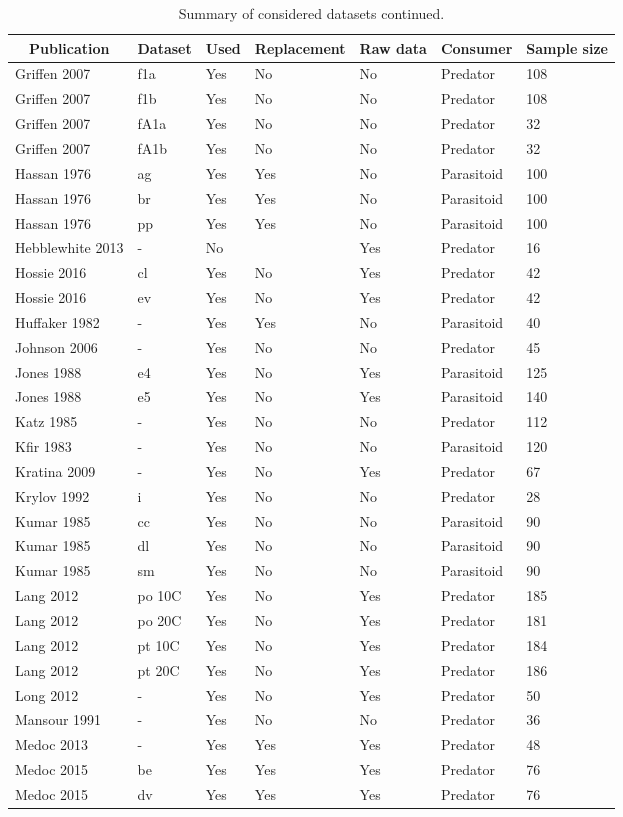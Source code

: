 \begin{table}[!tbp]
\caption{Summary of considered datasets continued.\label{table:datasets}} 
\begin{center}
\begin{tabular}{lllllll}
\hline\hline
\multicolumn{1}{c}{Publication}&\multicolumn{1}{c}{Dataset}&\multicolumn{1}{c}{Used}&\multicolumn{1}{c}{Replacement}&\multicolumn{1}{c}{Raw data}&\multicolumn{1}{c}{Consumer}&\multicolumn{1}{c}{Sample size}\tabularnewline
\hline
Griffen 2007&f1a&Yes&No&No&Predator&108\tabularnewline
Griffen 2007&f1b&Yes&No&No&Predator&108\tabularnewline
Griffen 2007&fA1a&Yes&No&No&Predator&32\tabularnewline
Griffen 2007&fA1b&Yes&No&No&Predator&32\tabularnewline
Hassan 1976&ag&Yes&Yes&No&Parasitoid&100\tabularnewline
Hassan 1976&br&Yes&Yes&No&Parasitoid&100\tabularnewline
Hassan 1976&pp&Yes&Yes&No&Parasitoid&100\tabularnewline
Hebblewhite 2013&-&No&&Yes&Predator&16\tabularnewline
Hossie 2016&cl&Yes&No&Yes&Predator&42\tabularnewline
Hossie 2016&ev&Yes&No&Yes&Predator&42\tabularnewline
Huffaker 1982&-&Yes&Yes&No&Parasitoid&40\tabularnewline
Johnson 2006&-&Yes&No&No&Predator&45\tabularnewline
Jones 1988&e4&Yes&No&Yes&Parasitoid&125\tabularnewline
Jones 1988&e5&Yes&No&Yes&Parasitoid&140\tabularnewline
Katz 1985&-&Yes&No&No&Predator&112\tabularnewline
Kfir 1983&-&Yes&No&No&Parasitoid&120\tabularnewline
Kratina 2009&-&Yes&No&Yes&Predator&67\tabularnewline
Krylov 1992&i&Yes&No&No&Predator&28\tabularnewline
Kumar 1985&cc&Yes&No&No&Parasitoid&90\tabularnewline
Kumar 1985&dl&Yes&No&No&Parasitoid&90\tabularnewline
Kumar 1985&sm&Yes&No&No&Parasitoid&90\tabularnewline
Lang 2012&po 10C&Yes&No&Yes&Predator&185\tabularnewline
Lang 2012&po 20C&Yes&No&Yes&Predator&181\tabularnewline
Lang 2012&pt 10C&Yes&No&Yes&Predator&184\tabularnewline
Lang 2012&pt 20C&Yes&No&Yes&Predator&186\tabularnewline
Long 2012&-&Yes&No&Yes&Predator&50\tabularnewline
Mansour 1991&-&Yes&No&No&Predator&36\tabularnewline
Medoc 2013&-&Yes&Yes&Yes&Predator&48\tabularnewline
Medoc 2015&be&Yes&Yes&Yes&Predator&76\tabularnewline
Medoc 2015&dv&Yes&Yes&Yes&Predator&76\tabularnewline
\hline
\end{tabular}\end{center}
\end{table}
